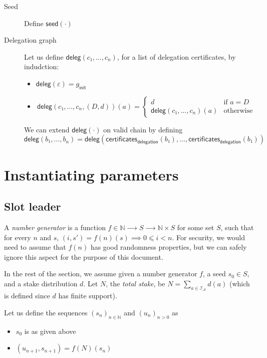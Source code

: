 \documentclass{article}
\newcommand{\improvement}[1]{\todo[linecolor=pink,backgroundcolor=pink!25,bordercolor=pink]{#1}}
\newcommand{\emptylist}{ε}
\newcommand{\idsof}[1]{\mathcal{I}\!_#1}
\newcommand{\agentids}{\idsof{\mathcal{A}}}
\newcommand{\initialdelegation}{g_{\mathsf{init}}}
\newcommand{\delegations}[1]{\mathsf{deleg}(#1)}
\newcommand{\epochseed}[1]{\mathsf{seed}(#1)}
\newcommand{\delegationcertificates}[1]{\mathsf{certificates}_\mathsf{delegation}(#1)}
\begin{document}
\begin{description}
\item[Seed]  Define
  $\epochseed{⋅}$\improvement{Todo}
\item[Delegation graph] Let us define $\delegations{c₁,…,c_n}$, for a
  list of delegation certificates, by indudction:
  \begin{itemize}
  \item $\delegations{\emptylist} = \initialdelegation$
  \item $$
    \delegations{c₁,…,c_n,(D,d)}(a) = \left\{
      \begin{array}{ll}
        d & \mbox{if $a=D$}\\
        \delegations{c₁,…,c_n}(a) & \mbox{otherwise}
      \end{array}\right.
      $$
  \end{itemize}

  We can extend $\delegations{⋅}$ on valid chain by defining
  $$
  \delegations{b₁,…,b_n} = \delegations{\delegationcertificates{b₁},…,\delegationcertificates{b₁}}
  $$

\end{description}

\section{Instantiating parameters}
\label{sec:params}


\subsection{Slot leader}
\label{sec:slot-leader}

A \emph{number generator} is a function $f ∈ ℕ ⟶ S ⟶ ℕ×S$ for some set
$S$, such that for every $n$ and $s$, $(i,s') = f(n)(s) ⟹ 0 ⩽ i <
n$. For security, we would need to assume that $f(n)$ has good
randomness properties, but we can safely ignore this aspect for the
purpose of this document.

In the rest of the section, we assume given a number generator $f$, a
seed $s_0∈S$, and a stake distribution $d$. Let $N$, the \emph{total
  stake}, be $N=∑_{a∈\agentids} d(a)$ (which is defined since $d$ has
finite support).

Let us define the sequences $(s_n)_{n∈ℕ}$ and $(u_n)_{n>0}$ as
\begin{itemize}
\item $s_0$ is as given above
\item $(u_{n+1}, s_{n+1}) = f(N)(s_n)$
\end{itemize}
\end{document}
